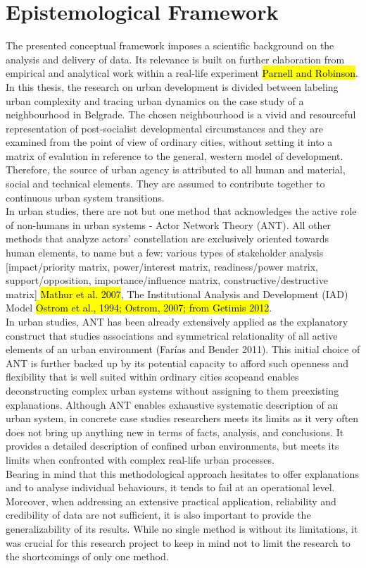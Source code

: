\documentclass[11pt]{report}
\begin{document}
\section{Epistemological Framework}
The presented conceptual framework imposes a scientific background on the analysis and delivery of data.
Its relevance is built on further elaboration from empirical and analytical work within a real-life experiment \hl{Parnell and Robinson}.
\\
In this thesis, the research on urban development is divided between labeling urban complexity and tracing urban dynamics on the case study of a neighbourhood in Belgrade. The chosen neighbourhood is a vivid and resourceful representation of post-socialist developmental circumstances and they are examined from the point of view of ordinary cities, without setting it into a matrix of evalution in reference to the general, western model of development.
Therefore, the source of urban agency is attributed to 
all human and material, social and technical elements. They are assumed to contribute together to continuous urban system transitions.
\\
In urban studies, there are not but one method that acknowledges the active role of non-humans in urban systems - Actor Network Theory (ANT).
All other methods that analyze actors' constellation are exclusively oriented towards human elements, to name but a few: various types of stakeholder analysis [impact/priority matrix, power/interest matrix, readiness/power matrix, support/opposition, importance/influence matrix,
constructive/destructive matrix] \hl{Mathur et al. 2007}, The Institutional Analysis and Development (IAD) Model \hl{Ostrom et al., 1994; Ostrom, 2007; from Getimis 2012}.
\\
In urban studies, ANT has been already extensively applied as the explanatory construct that studies associations and symmetrical relationality of all active elements of an urban environment (Farías and Bender 2011).
This initial choice of ANT is further backed up by its
potential capacity to afford such openness and flexibility that is well suited within ordinary cities scope\footnotemark and enables deconstructing complex urban systems without assigning to them preexisting explanations.
Although ANT enables exhaustive systematic description of an urban system, in concrete case studies researchers meets its limits as it very often does not bring up anything new in terms of facts, analysis, and conclusions. It provides a detailed description of confined urban environments, but meets its limits when confronted with complex real-life urban processes.
\\
Bearing in mind that this methodological approach hesitates to offer explanations and to analyse individual behaviours, it tends to fail at an operational level.
Moreover, when addressing an extensive practical application, reliability and credibility of data are not sufficient, it is also important to provide the generalizability of its results.
While no single method is without its limitations, it was crucial for this research project to keep in mind not to limit the research to the shortcomings of only one method.
\end{document}
